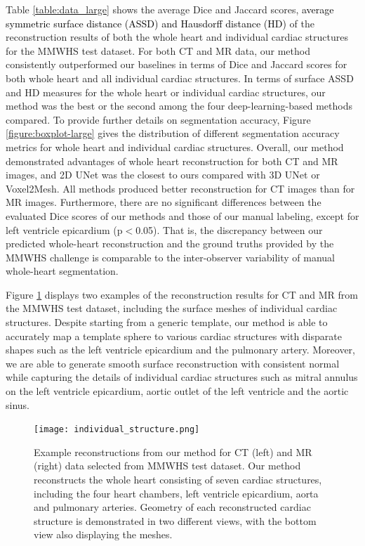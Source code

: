\documentclass[times,review,preprint,authoryear]{elsarticle}
\begin{document}
Table \ref{table:data_large} shows the average Dice and Jaccard scores, \textcolor{black}{average symmetric surface distance (ASSD) and Hausdorff distance (HD)} of the reconstruction results of both the whole heart and individual cardiac structures for the MMWHS test dataset. For both CT and MR data, our method consistently outperformed our baselines in terms of Dice and Jaccard scores for both whole heart and all individual cardiac structures. In terms of surface ASSD and HD measures for the whole heart or individual cardiac structures, our method was the best or the second among the four deep-learning-based methods compared. To provide further details on segmentation accuracy, Figure \ref{figure:boxplot-large} gives the distribution of different segmentation accuracy metrics for whole heart and individual cardiac structures. Overall, our method demonstrated advantages of whole heart reconstruction for both CT and MR images, and 2D UNet was the closest to ours compared with 3D UNet or Voxel2Mesh. All methods produced better reconstruction for CT images than for MR images. Furthermore, there are no significant differences between the evaluated Dice scores of our methods and those of our manual labeling, except for left ventricle epicardium (p$<$0.05). That is, the discrepancy between our predicted whole-heart reconstruction and the ground truths provided by the MMWHS challenge is comparable to the inter-observer variability of manual whole-heart segmentation.

Figure \ref{figure:structures} displays two examples of the reconstruction results for CT and MR from the MMWHS test dataset, including the surface meshes of individual cardiac structures. Despite starting from a generic template, our method is able to accurately map a template sphere to various cardiac structures with disparate shapes such as the left ventricle epicardium and the pulmonary artery. Moreover, we are able to generate smooth surface reconstruction with consistent normal while capturing the details of individual cardiac structures such as mitral annulus on the left ventricle epicardium, aortic outlet of the left ventricle and the aortic sinus. 

\begin{figure}[H]
\centering
\texttt{[image: individual\_structure.png]}   
\caption{Example reconstructions from our method for CT (left) and MR (right) data selected from MMWHS test dataset. Our method reconstructs the whole heart consisting of seven cardiac structures, including the four heart chambers, left ventricle epicardium, aorta and pulmonary arteries. Geometry of each reconstructed cardiac structure is demonstrated in two different views, with the bottom view also displaying the meshes.} 
\label{figure:structures}
\end{figure}
\end{document}
